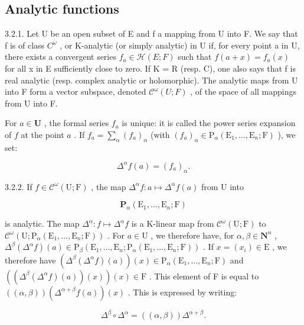 \subsection{Analytic functions}

3.2.1. Let U be an open subset of E and f a mapping from U into F. We say that f is of class \(C^{\omega}\) , or K-analytic (or simply analytic) in U if, for every point a in U, there exists a convergent series \(f_{a} \in \mathcal{H}(E; F)\) such that \(f(a + x) = f_{a}(x)\) for all x in E sufficiently close to zero. If K = R (resp. C), one also says that f is real analytic (resp. complex analytic or holomorphic). The analytic maps from U into F form a vector subspace, denoted \(\mathcal{C}^{\omega}(U; F)\) , of the space of all mappings from U into F.

For \(a \in \mathbf{U}\) , the formal series \(f_{a}\) is unique: it is called the power series expansion of \(f\) at the point \(a\) . If \(f_{a} = \sum_{\alpha}(f_{a})_{\alpha}\) (with \((f_{a})_{\alpha} \in \mathrm{P}_{\alpha}(\mathrm{E}_{1}, \ldots, \mathrm{E}_{n}; \mathrm{F})\) ), we set:

\[
\Delta^ {\alpha} f (a) = \left(f _ {a}\right) _ {\alpha}.
\]

3.2.2. If \(f \in \mathcal{C}^{\omega}(\mathrm{U};\mathrm{F})\) , the map \(\Delta^{\alpha}f: a \mapsto \Delta^{\alpha}f(a)\) from U into

\[
\mathbf {P} _ {\alpha} (\mathrm{E} _ {1}, \dots , \mathrm{E} _ {n}; \mathrm{F})
\]

is analytic. The map \(\Delta^{\alpha}: f \mapsto \Delta^{\alpha}f\) is a K-linear map from \(\mathcal{C}^{\omega}(\mathrm{U};\mathrm{F})\) to \(\mathcal{C}^{\omega}(\mathrm{U};\mathrm{P}_{\alpha}(\mathrm{E}_{1},\ldots,\mathrm{E}_{n};\mathrm{F}))\) . For \(a \in \mathrm{U}\) , we therefore have, for \(\alpha, \beta \in \mathbf{N}^{n}\) , \(\Delta^{\beta}(\Delta^{\alpha}f)(a) \in \mathrm{P}_{\beta}(\mathrm{E}_{1},\ldots,\mathrm{E}_{n};\mathrm{P}_{\alpha}(\mathrm{E}_{1},\ldots,\mathrm{E}_{n};\mathrm{F}))\) . If \(x = (x_{i}) \in \mathrm{E}\) , we therefore have \((\Delta^{\beta}(\Delta^{\alpha}f)(a))(x) \in \mathrm{P}_{\alpha}(\mathrm{E}_{1},\ldots,\mathrm{E}_{n};\mathrm{F})\) and \(((\Delta^{\beta}(\Delta^{\alpha}f)(a))(x))(x) \in \mathrm{F}\) . This element of F is equal to \(((\alpha, \beta)) (\Delta^{\alpha + \beta}f(a))(x)\) . This is expressed by writing:

\[
\Delta^ {\beta} \circ \Delta^ {\alpha} = ((\alpha , \beta)) \Delta^ {\alpha + \beta}.
\]

